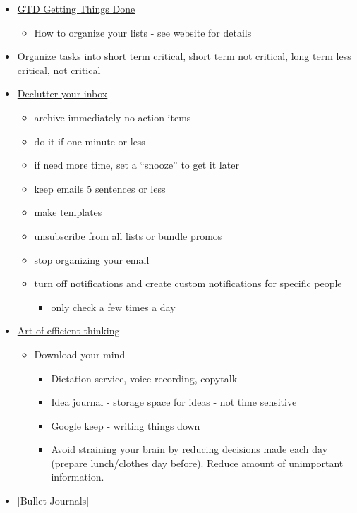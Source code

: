 \documentclass[
  letterpaper,
  DIV=11,
  numbers=noendperiod]{scrreprt}
\providecommand{\tightlist}{%
  \setlength{\itemsep}{0pt}\setlength{\parskip}{0pt}}\usepackage{longtable,booktabs,array}
\begin{document}
\begin{itemize}
\item
  \href{https://hamberg.no/gtd/}{GTD Getting Things Done}

  \begin{itemize}
  \tightlist
  \item
    How to organize your lists - see website for details
  \end{itemize}
\item
  Organize tasks into short term critical, short term not critical, long
  term less critical, not critical
\item
  \href{https://www.fastcompany.com/40507663/the-7-step-guide-to-achieving-inbox-zero-and-staying-there-in-2018}{Declutter
  your inbox}

  \begin{itemize}
  \item
    archive immediately no action items
  \item
    do it if one minute or less
  \item
    if need more time, set a ``snooze'' to get it later
  \item
    keep emails 5 sentences or less
  \item
    make templates
  \item
    unsubscribe from all lists or bundle promos
  \item
    stop organizing your email
  \item
    turn off notifications and create custom notifications for specific
    people

    \begin{itemize}
    \tightlist
    \item
      only check a few times a day
    \end{itemize}
  \end{itemize}
\item
  \href{https://productivityist.com/efficient-thinking/}{Art of
  efficient thinking}

  \begin{itemize}
  \item
    Download your mind

    \begin{itemize}
    \item
      Dictation service, voice recording, copytalk
    \item
      Idea journal - storage space for ideas - not time sensitive
    \item
      Google keep - writing things down
    \item
      Avoid straining your brain by reducing decisions made each day
      (prepare lunch/clothes day before). Reduce amount of unimportant
      information.
    \end{itemize}
  \end{itemize}
\item
  {[}Bullet Journals{]}


\end{itemize}
\end{document}
